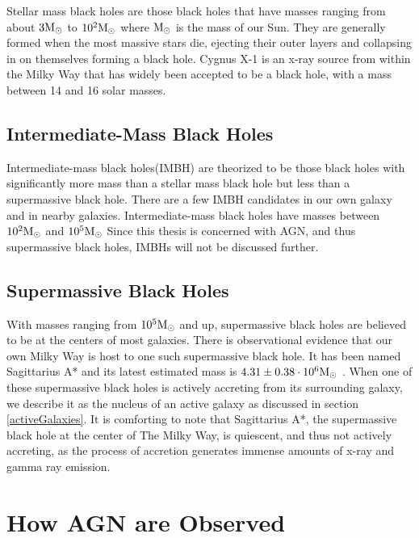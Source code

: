 \documentclass[12pt, oneside]{smuthesis}
\begin{document}
Stellar mass black holes are those black holes that have masses ranging from about $3\textup{M}_{\odot}$ to $10^{2}\textup{M}_{\odot}$ where $\textup{M}_{\odot}$ is the mass of our Sun. They are generally formed when the most massive stars die, ejecting their outer layers and collapsing in on themselves forming a black hole. Cygnus X-1 is an x-ray source from within the Milky Way that has widely been accepted to be a black hole, with a mass between 14 and 16 solar masses.

\subsection{\sc Intermediate-Mass Black Holes} \label{intermediateBH}

Intermediate-mass black holes(IMBH) are theorized to be those black holes with significantly more mass than a stellar mass black hole but less than a supermassive black hole. There are a few IMBH candidates in our own galaxy and in nearby galaxies. Intermediate-mass black holes have masses between $10^{2}\textup{M}_{\odot}$ and $10^{5}\textup{M}_{\odot}$ Since this thesis is concerned with AGN, and thus supermassive black holes, IMBHs will not be discussed further.

\subsection{\sc Supermassive Black Holes}

With masses ranging from $10^{5}\textup{M}_{\odot}$ and up, supermassive black holes are believed to be at the centers of most galaxies. There is observational evidence that our own Milky Way is host to one such supermassive black hole. It has been named Sagittarius A* and its latest estimated mass is $4.31\pm 0.38\cdot 10^{6}\textup{M}_{\odot}$ \cite{gillessen2009}. When one of these supermassive black holes is actively accreting from its surrounding galaxy, we describe it as the nucleus of an active galaxy as discussed in section \ref{activeGalaxies}. It is comforting to note that Sagittarius A*, the supermassive black hole at the center of The Milky Way, is quiescent, and thus not actively accreting, as the process of accretion generates immense amounts of x-ray and gamma ray emission.

\section{\sc How AGN are Observed} \label{howObserved}
\end{document}
